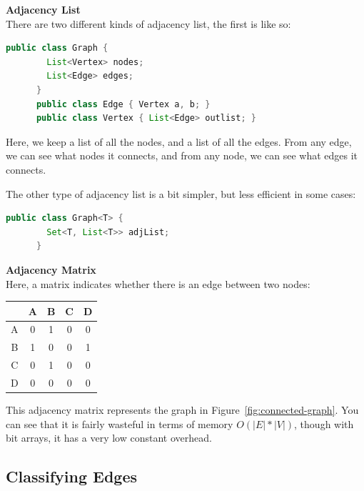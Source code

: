 \begin{description}
  \item \textbf{Adjacency List}\\
    There are two different kinds of adjacency list, the first is like so:

    \begin{lstlisting}[language=java]
      public class Graph {
        List<Vertex> nodes;
        List<Edge> edges;
      }
      public class Edge { Vertex a, b; }
      public class Vertex { List<Edge> outlist; }
    \end{lstlisting}

    Here, we keep a list of all the nodes, and a list of all the edges. From
    any edge, we can see what nodes it connects, and from any node, we can
    see what edges it connects.

    The other type of adjacency list is a bit simpler, but less efficient in
    some cases:

    \begin{lstlisting}[language=java]
      public class Graph<T> {
        Set<T, List<T>> adjList;
      }
    \end{lstlisting}
  \item \textbf{Adjacency Matrix}\\
    Here, a matrix indicates whether there is an edge between two nodes:

    \begin{center}
      \begin{tabular}{c|c c c c}
          & A & B & C & D\\ \hline
        A & 0 & 1 & 0 & 0\\
        B & 1 & 0 & 0 & 1\\
        C & 0 & 1 & 0 & 0\\
        D & 0 & 0 & 0 & 0\\
      \end{tabular}
    \end{center}

    This adjacency matrix represents the graph in
    Figure~\ref{fig:connected-graph}. You can see that it is fairly wasteful
    in terms of memory $O(|E|* |V|)$, though with bit arrays, it has a very 
    low constant overhead.
\end{description}

\subsection{Classifying Edges}

